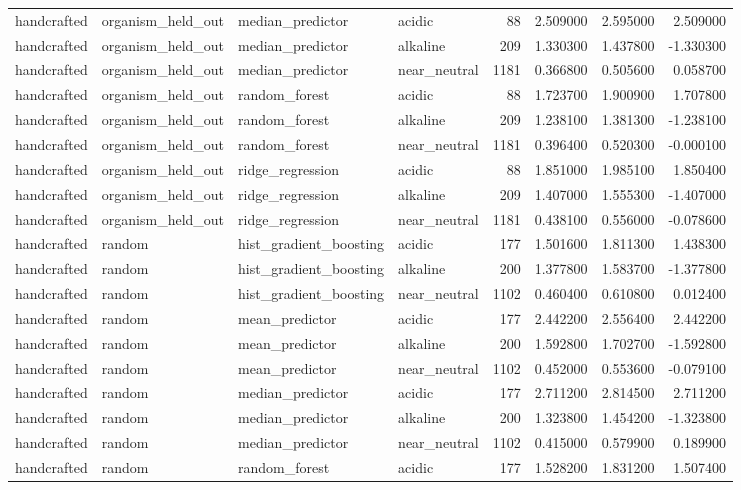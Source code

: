 \begin{longtable}{llllrrrr}
handcrafted & organism\_held\_out & median\_predictor & acidic & 88 & 2.509000 & 2.595000 & 2.509000 \\
handcrafted & organism\_held\_out & median\_predictor & alkaline & 209 & 1.330300 & 1.437800 & -1.330300 \\
handcrafted & organism\_held\_out & median\_predictor & near\_neutral & 1181 & 0.366800 & 0.505600 & 0.058700 \\
handcrafted & organism\_held\_out & random\_forest & acidic & 88 & 1.723700 & 1.900900 & 1.707800 \\
handcrafted & organism\_held\_out & random\_forest & alkaline & 209 & 1.238100 & 1.381300 & -1.238100 \\
handcrafted & organism\_held\_out & random\_forest & near\_neutral & 1181 & 0.396400 & 0.520300 & -0.000100 \\
handcrafted & organism\_held\_out & ridge\_regression & acidic & 88 & 1.851000 & 1.985100 & 1.850400 \\
handcrafted & organism\_held\_out & ridge\_regression & alkaline & 209 & 1.407000 & 1.555300 & -1.407000 \\
handcrafted & organism\_held\_out & ridge\_regression & near\_neutral & 1181 & 0.438100 & 0.556000 & -0.078600 \\
handcrafted & random & hist\_gradient\_boosting & acidic & 177 & 1.501600 & 1.811300 & 1.438300 \\
handcrafted & random & hist\_gradient\_boosting & alkaline & 200 & 1.377800 & 1.583700 & -1.377800 \\
handcrafted & random & hist\_gradient\_boosting & near\_neutral & 1102 & 0.460400 & 0.610800 & 0.012400 \\
handcrafted & random & mean\_predictor & acidic & 177 & 2.442200 & 2.556400 & 2.442200 \\
handcrafted & random & mean\_predictor & alkaline & 200 & 1.592800 & 1.702700 & -1.592800 \\
handcrafted & random & mean\_predictor & near\_neutral & 1102 & 0.452000 & 0.553600 & -0.079100 \\
handcrafted & random & median\_predictor & acidic & 177 & 2.711200 & 2.814500 & 2.711200 \\
handcrafted & random & median\_predictor & alkaline & 200 & 1.323800 & 1.454200 & -1.323800 \\
handcrafted & random & median\_predictor & near\_neutral & 1102 & 0.415000 & 0.579900 & 0.189900 \\
handcrafted & random & random\_forest & acidic & 177 & 1.528200 & 1.831200 & 1.507400 \\

\end{longtable}
